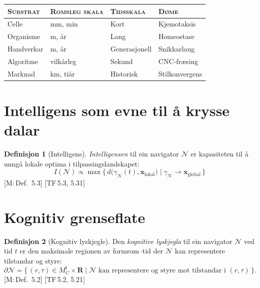 \documentclass[10pt]{book}
\renewcommand{\footnotesize}{\fontsize{8pt}{10pt}\selectfont}
\theoremstyle{definition}
\newtheorem{definisjon}{Definisjon}[chapter]
\theoremstyle{plain}
\theoremstyle{remark}
\newcommand{\MC}{M^{\mathsf{I}}_C}
\providecommand{\R}{}
\renewcommand{\R}{\mathbf{R}}
\newcommand{\Nav}{\mathcal{N}}
\newcommand{\CogBound}{\partial\!\Nav}
\newcommand{\TF}[1]{\textnormal{[TF\,#1]}}
\newcommand{\Mref}[1]{\textnormal{[M:\,#1]}}
\begin{document}
\begin{center}
{\footnotesize
\begin{tabular}{@{}l@{\quad}l@{\quad}l@{\quad}l@{}}
\toprule
\textsc{Substrat} & \textsc{Romsleg skala} & \textsc{Tidsskala} & \textsc{D\o me} \\
\midrule
Celle & mm, min & Kort & Kjemotaksis \\
Organisme & m, \aa r & Lang & Homeostase \\
Handverkar & m, \aa r & Generasjonell & Snikkarlaug \\
Algoritme & vilk\aa rleg & Sekund & CNC-fr\ae sing \\
Marknad & km, ti\aa r & Historisk & Stilkonvergens \\
\bottomrule
\end{tabular}
}
\end{center}

\section{Intelligens som evne til \aa{} krysse dalar}\label{sec:nav:intelligens}

\begin{definisjon}[Intelligens]\label{def:intelligens}
\emph{Intelligensen} til ein navigator $\Nav$ er kapasiteten til \aa{} unng\aa{} lokale optima i tilpassingslandskapet:
\[
  I(\Nav) \propto \max\bigl\{\, d\bigl(\gamma_\Nav(t), \bm{x}_{\mathrm{lokal}}\bigr) \;\big|\; \gamma_\Nav \to \bm{x}_{\mathrm{global}} \,\bigr\}
\]
\Mref{Def.~5.3} \TF{5.3, 5.31}
\end{definisjon}

\section{Kognitiv grenseflate}\label{sec:nav:lyskjegle}

\begin{definisjon}[Kognitiv lyskjegle]\label{def:lyskjegle}
Den \emph{kognitive lyskjegla} til ein navigator $\Nav$ ved tid $t$ er den maksimale regionen av formrom--tid der $\Nav$ kan representere tilstandar og styre:
\[
  \CogBound = \bigl\{\, (r, \tau) \in \MC \times \R \;\big|\; \Nav \text{ kan representere og styre mot tilstandar i } (r, \tau) \,\bigr\}.
\]
\Mref{Def.~5.2} \TF{5.2, 5.21}
\end{definisjon}
\end{document}
